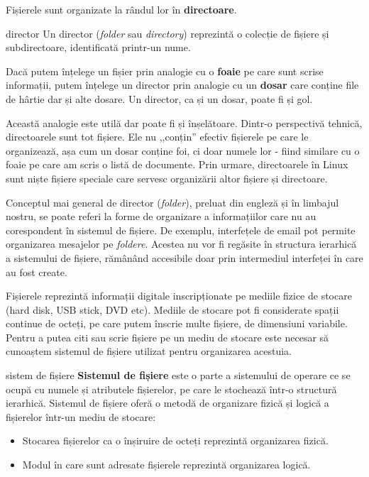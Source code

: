 Fișierele sunt organizate la rândul lor în \textbf{directoare}.

\begin{definition}{director}
Un director (\textit{folder} sau \textit{directory}) reprezintă o colecție de fișiere și subdirectoare, identificată printr-un nume.
\end{definition}

Dacă putem înțelege un fișier prin analogie cu o \textbf{foaie} pe care sunt
scrise informații, putem înțelege un director prin analogie cu un \textbf{dosar}
care conține file de hârtie dar și alte dosare. Un director, ca și un dosar,
poate fi și gol.

Această analogie este utilă dar poate fi și înșelătoare. Dintr-o perspectivă tehnică, directoarele sunt tot fișiere. Ele nu ,,conțin'' efectiv
fișierele pe care le organizează, așa cum un dosar conține foi, ci doar numele
lor - fiind similare cu o foaie pe care am scris o listă de documente. Prin
urmare, directoarele în Linux sunt niște fișiere speciale care servesc
organizării altor fișiere și directoare.

\begin{note}
Conceptul mai general de director (\textit{folder}), preluat din engleză și în limbajul nostru, se
poate referi la forme de organizare a informațiilor care nu au corespondent în
sistemul de fișiere. De exemplu, interfețele de email pot permite organizarea
mesajelor pe \textit{foldere}. Acestea nu vor fi regăsite în structura ierarhică a
sistemului de fișiere, rămânând accesibile doar prin intermediul interfeței în
care au fost create.
\end{note}

Fișierele reprezintă informații digitale inscripționate pe mediile fizice de
stocare (hard disk, USB stick, DVD etc). Mediile de stocare pot fi considerate
spații continue de octeți, pe care putem înscrie multe fișiere, de dimensiuni
variabile. Pentru a putea citi sau scrie fișiere pe un mediu de stocare este
necesar să cunoaștem sistemul de fișiere utilizat pentru organizarea acestuia.

\begin{definition}{sistem de fișiere}
\textbf{Sistemul de fișiere} este o parte a sistemului de operare ce se ocupă cu
numele și atributele fișierelor, pe care le stochează într-o structură
ierarhică. Sistemul de fișiere oferă o metodă de organizare fizică și logică a
fișierelor într-un mediu de stocare:

\begin{itemize}
	\item Stocarea fișierelor ca o înșiruire de octeți reprezintă
		organizarea fizică.
	\item Modul în care sunt adresate fișierele reprezintă organizarea
		logică.
\end{itemize}
\end{definition}

